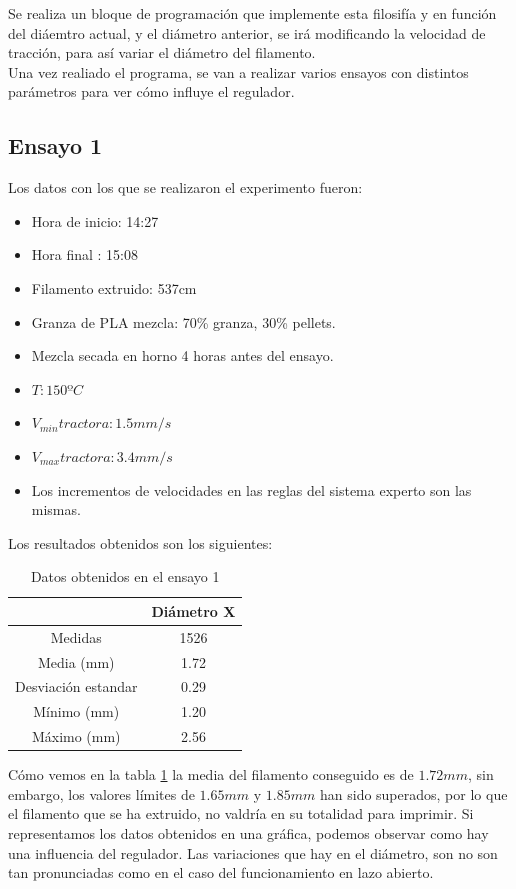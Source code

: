 Se realiza un bloque de programación que implemente esta filosifía y en función del diáemtro actual, y el diámetro anterior, se irá modificando la velocidad de tracción, para así variar el diámetro del filamento.\\

Una vez realiado el programa, se van a realizar varios ensayos con distintos parámetros para ver cómo influye el regulador.

\subsection{Ensayo 1}

Los datos con los que se realizaron el experimento fueron:

\begin{itemize}
	\item{Hora de inicio: 14:27}
	\item{Hora final : 15:08}
	\item{Filamento extruido: 537cm}
	\item{Granza de PLA mezcla: 70\% granza, 30\% pellets.}
	\item{Mezcla secada en horno 4 horas antes del ensayo.}
	\item{$T: 150ºC$}
	\item{$V_{min} tractora: 1.5 mm/s$}
	\item{$V_{max} tractora: 3.4 mm/s$}
	\item{Los incrementos de velocidades en las reglas del sistema experto son las mismas.}
\end{itemize}

Los resultados obtenidos son los siguientes:

\begin{table}[H]
	\centering
	\begin{tabular}{cc}
		                    & Diámetro X \\ \hline
		Medidas             & 1526       \\
		Media (mm)          & 1.72       \\
		Desviación estandar & 0.29       \\
		Mínimo (mm)         & 1.20       \\
		Máximo (mm)         & 2.56      
	\end{tabular}
	\caption{Datos obtenidos en el ensayo 1}
	\label{tab:resl_ens1}
\end{table}

Cómo vemos en la tabla \ref{tab:resl_ens1} la media del filamento conseguido es de $1.72 mm$, sin embargo, los valores límites de $1.65 mm$ y $1.85 mm$ han sido superados, por lo que el filamento que se ha extruido, no valdría en su totalidad para imprimir. Si representamos los datos obtenidos en una gráfica, podemos observar como hay una influencia del regulador. Las variaciones que hay en el diámetro, son no son tan pronunciadas como en el caso del funcionamiento en lazo abierto. \\

